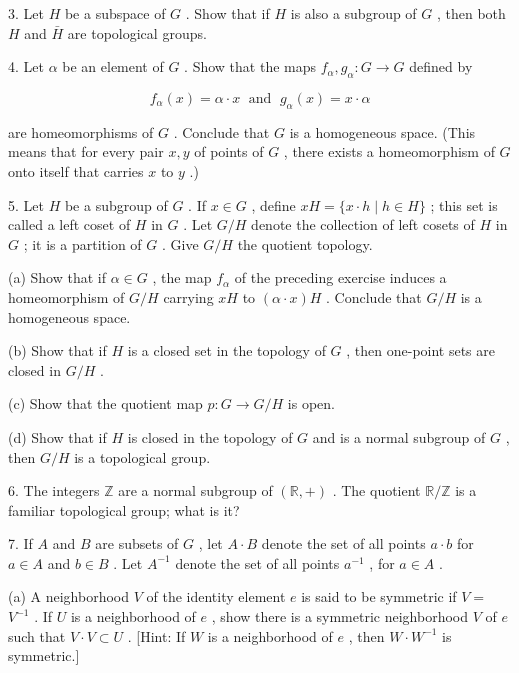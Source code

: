 3. Let \(H\) be a subspace of \(G\) . Show that if \(H\) is also a subgroup of \(G\) , then both \(H\) and \(\bar{H}\) are topological groups.

4. Let \(\alpha\) be an element of \(G\) . Show that the maps \({f}_{\alpha },{g}_{\alpha } : G \rightarrow  G\) defined by

\[
{f}_{\alpha }\left( x\right)  = \alpha  \cdot  x\;\text{ and }\;{g}_{\alpha }\left( x\right)  = x \cdot  \alpha
\]

are homeomorphisms of \(G\) . Conclude that \(G\) is a homogeneous space. (This means that for every pair \(x,y\) of points of \(G\) , there exists a homeomorphism of \(G\) onto itself that carries \(x\) to \(y\) .)

5. Let \(H\) be a subgroup of \(G\) . If \(x \in  G\) , define \({xH} = \{ x \cdot  h \mid  h \in  H\}\) ; this set is called a left coset of \(H\) in \(G\) . Let \(G/H\) denote the collection of left cosets of \(H\) in \(G\) ; it is a partition of \(G\) . Give \(G/H\) the quotient topology.

(a) Show that if \(\alpha  \in  G\) , the map \({f}_{\alpha }\) of the preceding exercise induces a homeomorphism of \(G/H\) carrying \({xH}\) to \(\left( {\alpha  \cdot  x}\right) H\) . Conclude that \(G/H\) is a homogeneous space.

(b) Show that if \(H\) is a closed set in the topology of \(G\) , then one-point sets are closed in \(G/H\) .

(c) Show that the quotient map \(p : G \rightarrow  G/H\) is open.

(d) Show that if \(H\) is closed in the topology of \(G\) and is a normal subgroup of \(G\) , then \(G/H\) is a topological group.

6. The integers \(\mathbb{Z}\) are a normal subgroup of \(\left( {\mathbb{R}, + }\right)\) . The quotient \(\mathbb{R}/\mathbb{Z}\) is a familiar topological group; what is it?

7. If \(A\) and \(B\) are subsets of \(G\) , let \(A \cdot  B\) denote the set of all points \(a \cdot  b\) for \(a \in  A\) and \(b \in  B\) . Let \({A}^{-1}\) denote the set of all points \({a}^{-1}\) , for \(a \in  A\) .

(a) A neighborhood \(V\) of the identity element \(e\) is said to be symmetric if \(V =\)  \({V}^{-1}\) . If \(U\) is a neighborhood of \(e\) , show there is a symmetric neighborhood \(V\) of \(e\) such that \(V \cdot  V \subset  U\) . [Hint: If \(W\) is a neighborhood of \(e\) , then \(W \cdot  {W}^{-1}\) is symmetric.]

